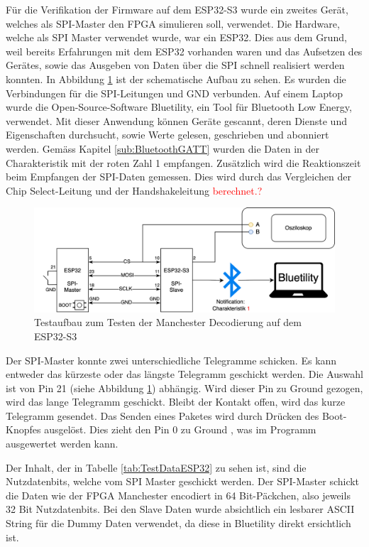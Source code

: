 Für die Verifikation der Firmware auf dem ESP32-S3 wurde ein zweites Gerät, welches als SPI-Master den FPGA simulieren soll, verwendet. Die Hardware, welche als SPI Master verwendet wurde, war ein ESP32. Dies aus dem Grund, weil bereits Erfahrungen mit dem ESP32 vorhanden waren und das Aufsetzen des Gerätes, sowie das Ausgeben von Daten über die SPI schnell realisiert werden konnten. In Abbildung \ref{fig:TestszenarioESP32} ist der schematische Aufbau zu sehen. Es wurden die Verbindungen für die SPI-Leitungen und GND verbunden. Auf einem Laptop wurde die Open-Source-Software Bluetility\cite{BLUETILITY_APPLICATION}, ein Tool für Bluetooth Low Energy, verwendet. Mit dieser Anwendung können Geräte gescannt, deren Dienste und Eigenschaften durchsucht, sowie Werte gelesen, geschrieben und abonniert werden. Gemäss Kapitel \ref{sub:BluetoothGATT} wurden die Daten in der Charakteristik mit der roten Zahl 1 empfangen. Zusätzlich wird die Reaktionszeit beim Empfangen der SPI-Daten gemessen. Dies wird durch das Vergleichen der Chip Select-Leitung und der Handshakeleitung \textcolor{red}{berechnet.?} 

\begin{figure}[H]
    \centering
    \includegraphics[width=0.9\linewidth]{Figures/Chap3/Testszenarien/Testszenario_ESP32.png}
    \caption{Testaufbau zum Testen der Manchester Decodierung auf dem ESP32-S3}
    \label{fig:TestszenarioESP32}
\end{figure}

Der SPI-Master konnte zwei unterschiedliche Telegramme schicken. Es kann entweder das kürzeste oder das längste Telegramm geschickt werden. Die Auswahl ist von Pin 21 (siehe Abbildung \ref{fig:TestszenarioESP32}) abhängig. Wird dieser Pin zu Ground gezogen, wird das lange Telegramm geschickt. Bleibt der Kontakt offen, wird das kurze Telegramm gesendet. Das Senden eines Paketes wird durch Drücken des Boot-Knopfes ausgelöst. Dies zieht den Pin 0 zu Ground , was im Programm ausgewertet werden kann. 

Der Inhalt, der in Tabelle \ref{tab:TestDataESP32} zu sehen ist, sind die Nutzdatenbits, welche vom SPI Master geschickt werden. Der SPI-Master schickt die Daten wie der FPGA Manchester encodiert in 64 Bit-Päckchen, also jeweils 32 Bit Nutzdatenbits. Bei den Slave Daten wurde absichtlich ein lesbarer ASCII String für die Dummy Daten verwendet, da diese in Bluetility direkt ersichtlich ist.

